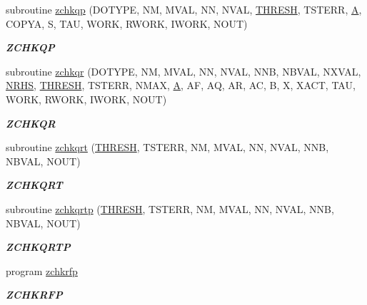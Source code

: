 \begin{DoxyCompactItemize}
subroutine \hyperlink{group__complex16__lin_ga9a57d897d3b3d225573a7080c8ce7b6d}{zchkqp} (D\+O\+T\+Y\+P\+E, N\+M, M\+V\+A\+L, N\+N, N\+V\+A\+L, \hyperlink{zlaqgs_8c_a0656018abfc9fa2821827415f5d5ea57}{T\+H\+R\+E\+S\+H}, T\+S\+T\+E\+R\+R, \hyperlink{classA}{A}, C\+O\+P\+Y\+A, S, T\+A\+U, W\+O\+R\+K, R\+W\+O\+R\+K, I\+W\+O\+R\+K, N\+O\+U\+T)
\begin{DoxyCompactList}\small\item\em {\bfseries Z\+C\+H\+K\+Q\+P} \end{DoxyCompactList}\item 
subroutine \hyperlink{group__complex16__lin_gad9c1033be305d24761b1bc0263fafe0a}{zchkqr} (D\+O\+T\+Y\+P\+E, N\+M, M\+V\+A\+L, N\+N, N\+V\+A\+L, N\+N\+B, N\+B\+V\+A\+L, N\+X\+V\+A\+L, \hyperlink{example__user_8c_aa0138da002ce2a90360df2f521eb3198}{N\+R\+H\+S}, \hyperlink{zlaqgs_8c_a0656018abfc9fa2821827415f5d5ea57}{T\+H\+R\+E\+S\+H}, T\+S\+T\+E\+R\+R, N\+M\+A\+X, \hyperlink{classA}{A}, A\+F, A\+Q, A\+R, A\+C, B, X, X\+A\+C\+T, T\+A\+U, W\+O\+R\+K, R\+W\+O\+R\+K, I\+W\+O\+R\+K, N\+O\+U\+T)
\begin{DoxyCompactList}\small\item\em {\bfseries Z\+C\+H\+K\+Q\+R} \end{DoxyCompactList}\item 
subroutine \hyperlink{group__complex16__lin_ga54c4ed4d0acdb6353a6c2aebfe3be0ef}{zchkqrt} (\hyperlink{zlaqgs_8c_a0656018abfc9fa2821827415f5d5ea57}{T\+H\+R\+E\+S\+H}, T\+S\+T\+E\+R\+R, N\+M, M\+V\+A\+L, N\+N, N\+V\+A\+L, N\+N\+B, N\+B\+V\+A\+L, N\+O\+U\+T)
\begin{DoxyCompactList}\small\item\em {\bfseries Z\+C\+H\+K\+Q\+R\+T} \end{DoxyCompactList}\item 
subroutine \hyperlink{group__complex16__lin_gad8464ed78b9dfb105a6e761890547c70}{zchkqrtp} (\hyperlink{zlaqgs_8c_a0656018abfc9fa2821827415f5d5ea57}{T\+H\+R\+E\+S\+H}, T\+S\+T\+E\+R\+R, N\+M, M\+V\+A\+L, N\+N, N\+V\+A\+L, N\+N\+B, N\+B\+V\+A\+L, N\+O\+U\+T)
\begin{DoxyCompactList}\small\item\em {\bfseries Z\+C\+H\+K\+Q\+R\+T\+P} \end{DoxyCompactList}\item 
program \hyperlink{group__complex16__lin_gae8035dbdfd107d0b59a175bdfa9b5186}{zchkrfp}
\begin{DoxyCompactList}\small\item\em {\bfseries Z\+C\+H\+K\+R\+F\+P} \end{DoxyCompactList}\item 

\end{DoxyCompactItemize}
